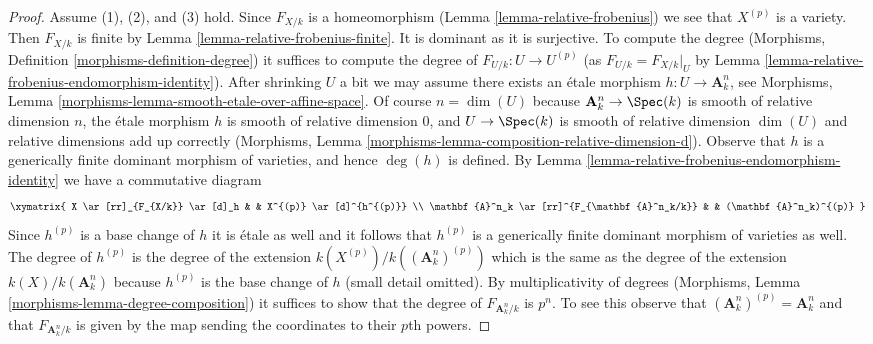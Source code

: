 \begin{proof}
\medskip\noindent
Assume (1), (2), and (3) hold. Since $F_{X/k}$ is a homeomorphism
(Lemma \ref{lemma-relative-frobenius}) we see that $X^{(p)}$ is a variety.
Then $F_{X/k}$ is finite by Lemma \ref{lemma-relative-frobenius-finite}.
It is dominant as it is surjective. To compute the degree
(Morphisms, Definition \ref{morphisms-definition-degree})
it suffices to compute the degree of $F_{U/k} : U \to U^{(p)}$
(as $F_{U/k} = F_{X/k}|_U$ by
Lemma \ref{lemma-relative-frobenius-endomorphism-identity}).
After shrinking $U$ a bit we may assume there exists an
\'etale morphism $h : U \to \mathbf{A}^n_k$, see
Morphisms, Lemma \ref{morphisms-lemma-smooth-etale-over-affine-space}.
Of course $n = \dim(U)$ because
$\mathbf{A}^n_k \to \Spec(k)$ is smooth of relative dimension $n$,
the \'etale morphism $h$ is smooth of relative dimension $0$, and
$U \to \Spec(k)$ is smooth of relative dimension $\dim(U)$
and relative dimensions add up correctly
(Morphisms, Lemma \ref{morphisms-lemma-composition-relative-dimension-d}).
Observe that $h$ is a generically finite dominant morphism
of varieties, and hence $\deg(h)$ is defined.
By Lemma \ref{lemma-relative-frobenius-endomorphism-identity}
we have a commutative diagram
$$
\xymatrix{
X \ar[rr]_{F_{X/k}} \ar[d]_h & & X^{(p)} \ar[d]^{h^{(p)}} \\
\mathbf{A}^n_k \ar[rr]^{F_{\mathbf{A}^n_k/k}} & &
(\mathbf{A}^n_k)^{(p)}
}
$$
Since $h^{(p)}$ is a base change of $h$ it is \'etale as well
and it follows that $h^{(p)}$ is a generically finite dominant
morphism of varieties as well. The degree of $h^{(p)}$ is the
degree of the extension $k(X^{(p)})/k((\mathbf{A}^n_k)^{(p)})$
which is the same as the degree of the extension $k(X)/k(\mathbf{A}^n_k)$
because $h^{(p)}$ is the base change of $h$ (small detail omitted).
By multiplicativity of degrees
(Morphisms, Lemma \ref{morphisms-lemma-degree-composition})
it suffices to show that the degree of $F_{\mathbf{A}^n_k/k}$
is $p^n$. To see this observe that
$(\mathbf{A}^n_k)^{(p)} = \mathbf{A}^n_k$ and that
$F_{\mathbf{A}^n_k/k}$ is given by the map sending the
coordinates to their $p$th powers.
\end{proof}

